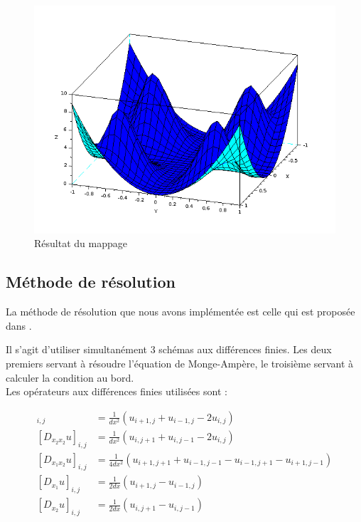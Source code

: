 \documentclass[12pt,a4paper,twoside]{article}
\begin{document}
\begin{figure}
\begin{center}
\includegraphics[scale=0.5]{Images/resmapchoisie.png}
\caption{Résultat du mappage}
\label{resultmappage}
\end{center}
\end{figure}


\subsection{Méthode de résolution}

La méthode de résolution que nous avons implémentée est celle qui est proposée dans \cite{benamou2014numerical}.

Il s'agit d'utiliser simultanément 3 schémas aux différences finies. Les deux premiers servant à résoudre l'équation
de Monge-Ampère, le troisième servant à calculer la condition au bord. \\


Les opérateurs aux différences finies utilisées sont :

\begin{align*}
[D_{x_1 x_1 }u]_{i,j} &= \frac{1}{dx^2} (u_{i+1,j} + u_{i-1,j}  - 2u_{i,j}) \\
[D_{x_2 x_2 }u]_{i,j} &= \frac{1}{dx^2} (u_{i,j+1} + u_{i,j-1}  - 2u_{i,j}) \\
[D_{x_1 x_2 }u]_{i,j} &= \frac{1}{4dx^2} (u_{i+1,j+1} + u_{i-1,j-1} - u_{i-1,j+1} -  u_{i+1,j-1}) \\
[D_{x_1 }u]_{i,j} &= \frac{1}{2dx} (u_{i+1,j} - u_{i-1,j} )\\
[D_{x_2 }u]_{i,j} &= \frac{1}{2dx} (u_{i,j+1} - u_{i,j-1} ) \\
\end{align*}
\end{document}
